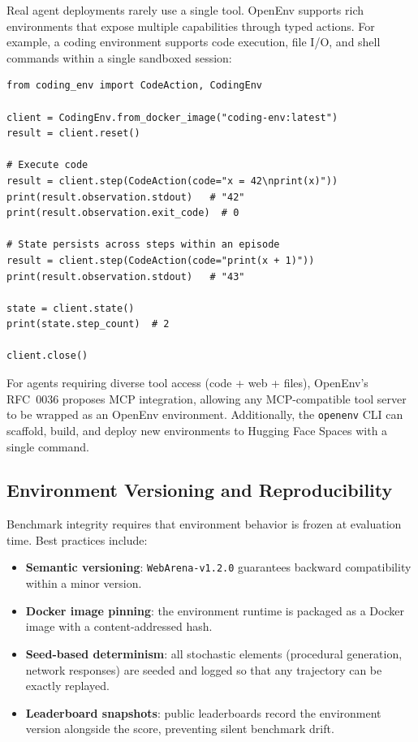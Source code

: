 Real agent deployments rarely use a single tool. OpenEnv supports rich environments that expose multiple capabilities through typed actions. For example, a coding environment supports code execution, file I/O, and shell commands within a single sandboxed session:

\begin{lstlisting}[style=pythonstyle]
from coding_env import CodeAction, CodingEnv

client = CodingEnv.from_docker_image("coding-env:latest")
result = client.reset()

# Execute code
result = client.step(CodeAction(code="x = 42\nprint(x)"))
print(result.observation.stdout)   # "42"
print(result.observation.exit_code)  # 0

# State persists across steps within an episode
result = client.step(CodeAction(code="print(x + 1)"))
print(result.observation.stdout)   # "43"

state = client.state()
print(state.step_count)  # 2

client.close()
\end{lstlisting}

For agents requiring diverse tool access (code + web + files), OpenEnv’s RFC~0036 proposes MCP integration, allowing any MCP-compatible tool server to be wrapped as an OpenEnv environment. Additionally, the \texttt{openenv} CLI can scaffold, build, and deploy new environments to Hugging Face Spaces with a single command.

\subsection{Environment Versioning and Reproducibility}
\label{environment-versioning-and-reproducibility}

Benchmark integrity requires that environment behavior is frozen at evaluation time. Best practices include:

\begin{itemize}
  \item \textbf{Semantic versioning}: \texttt{WebArena-v1.2.0} guarantees backward compatibility within a minor version.
  \item \textbf{Docker image pinning}: the environment runtime is packaged as a Docker image with a content-addressed hash.
  \item \textbf{Seed-based determinism}: all stochastic elements (procedural generation, network responses) are seeded and logged so that any trajectory can be exactly replayed.
  \item \textbf{Leaderboard snapshots}: public leaderboards record the environment version alongside the score, preventing silent benchmark drift.
\end{itemize}

